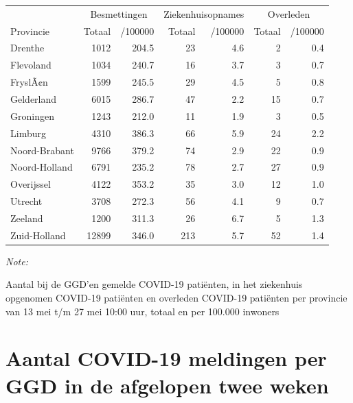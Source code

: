 \documentclass[
  english,
  man,floatsintext]{apa6}
\begin{document}
\begin{table}
\centering
\begin{threeparttable}
\begin{tabular}{lrrrrrr}
\toprule
\multicolumn{1}{c}{ } & \multicolumn{2}{c}{Besmettingen} & \multicolumn{2}{c}{Ziekenhuisopnames} & \multicolumn{2}{c}{Overleden} \\
\cmidrule(l{3pt}r{3pt}){2-3} \cmidrule(l{3pt}r{3pt}){4-5} \cmidrule(l{3pt}r{3pt}){6-7}
Provincie & Totaal & /100000 & Totaal & /100000 & Totaal & /100000\\
\midrule
Drenthe & 1012 & 204.5 & 23 & 4.6 & 2 & 0.4\\
Flevoland & 1034 & 240.7 & 16 & 3.7 & 3 & 0.7\\
FryslÃ¢n & 1599 & 245.5 & 29 & 4.5 & 5 & 0.8\\
Gelderland & 6015 & 286.7 & 47 & 2.2 & 15 & 0.7\\
Groningen & 1243 & 212.0 & 11 & 1.9 & 3 & 0.5\\
Limburg & 4310 & 386.3 & 66 & 5.9 & 24 & 2.2\\
Noord-Brabant & 9766 & 379.2 & 74 & 2.9 & 22 & 0.9\\
Noord-Holland & 6791 & 235.2 & 78 & 2.7 & 27 & 0.9\\
Overijssel & 4122 & 353.2 & 35 & 3.0 & 12 & 1.0\\
Utrecht & 3708 & 272.3 & 56 & 4.1 & 9 & 0.7\\
Zeeland & 1200 & 311.3 & 26 & 6.7 & 5 & 1.3\\
Zuid-Holland & 12899 & 346.0 & 213 & 5.7 & 52 & 1.4\\
\bottomrule
\end{tabular}
\begin{tablenotes}
\item \textit{Note: } 
\item Aantal bij de GGD’en gemelde COVID-19 patiënten, in het ziekenhuis opgenomen COVID-19 patiënten en overleden COVID-19 patiënten per provincie van 13 mei t/m 27 mei 10:00 uur, totaal en per 100.000 inwoners
\end{tablenotes}
\end{threeparttable}
\end{table}

\newpage

\hypertarget{aantal-covid-19-meldingen-per-ggd-in-de-afgelopen-twee-weken}{%
\section{Aantal COVID-19 meldingen per GGD in de afgelopen twee weken}\label{aantal-covid-19-meldingen-per-ggd-in-de-afgelopen-twee-weken}}
\end{document}
